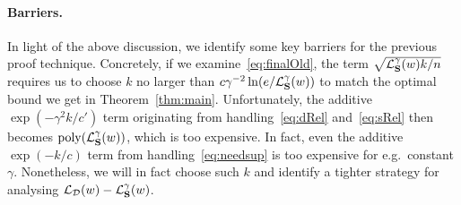\paragraph{Barriers.}
In light of the above discussion, we identify some key barriers for the previous proof technique. Concretely, if we examine~\eqref{eq:finalOld}, the term $\sqrt{\mathcal{L}_{\mathbf{S}}^\gamma(w) k/n}$ requires us to choose $k$ no larger than $c \gamma^{-2} \ln(e/\mathcal{L}_{\mathbf{S}}^\gamma(w))$ to match the optimal bound we get in Theorem~\ref{thm:main}. Unfortunately, the additive $\exp(-\gamma^2 k/c')$ term originating from handling~\eqref{eq:dRel} and~\eqref{eq:sRel} then becomes $\operatorname{poly}(\mathcal{L}_{\mathbf{S}}^\gamma(w))$, which is too expensive. In fact, even the additive $\exp(-k/c)$ term from handling~\eqref{eq:needsup} is too expensive for e.g.\ constant $\gamma$. Nonetheless, we will in fact choose such $k$ and identify a tighter strategy for analysing $\mathcal{L}_{\mathcal{D}}(w) - \mathcal{L}^\gamma_{\mathbf{S}}(w)$.


